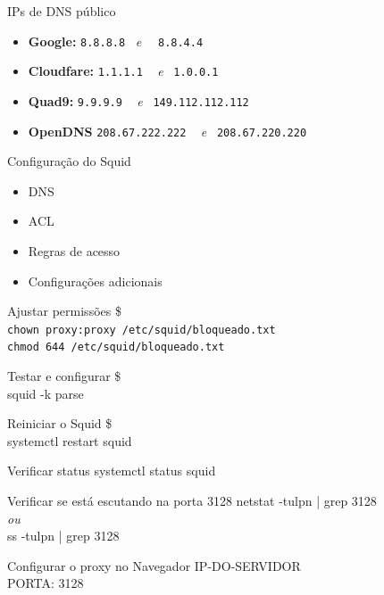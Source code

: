 \documentclass{if-beamer}
\begin{document}
 \begin{frame}{IPs de DNS público}
 	\begin{itemize}
 		\item \textbf{Google:} \texttt{8.8.8.8}~ \emph{e}~ ~\texttt{8.8.4.4}
 		\item \textbf{Cloudfare:} \texttt{1.1.1.1} ~ \emph{e}~ \texttt{1.0.0.1}
 		\item \textbf{Quad9:} \texttt{9.9.9.9} ~ \emph{e}~ \texttt{149.112.112.112}
 		\item \textbf{OpenDNS} \texttt{208.67.222.222} ~ \emph{e}~ \texttt{208.67.220.220}
 	\end{itemize}
 
 \end{frame}
 
 \begin{frame}[allowframebreaks]{Configuração do Squid}
 	\begin{itemize}
 		\item DNS
 		\item ACL
 		\item Regras de acesso
 		\item Configurações adicionais
 	\end{itemize} 
 
 	\framebreak
 	
 	\begin{exampleblock}{Ajustar permissões}
 	\large
 		\$ \\
 		\texttt{chown proxy:proxy /etc/squid/bloqueado.txt} \\
		\texttt{chmod 644 /etc/squid/bloqueado.txt}
	\end{exampleblock}
	
	\framebreak
	\begin{exampleblock}{Testar e configurar}
	\$ \\
		squid -k parse
	\end{exampleblock}
	\framebreak
	\begin{exampleblock}{Reiniciar o Squid}
		\centering
		\Large	
		\$ \\
			systemctl restart squid
	\end{exampleblock}
	
	\framebreak
	
	\begin{exampleblock}{Verificar status}
		\centering
			systemctl status squid
	\end{exampleblock}
	\begin{exampleblock}{Verificar se está escutando na porta 3128}
	\centering	
	netstat -tulpn | grep 3128
	\\ \emph{ou} \\
		ss -tulpn | grep 3128
	\end{exampleblock}
	
	\framebreak
	
	\begin{exampleblock}{Configurar o proxy no Navegador}
			\large
			\centering
				IP-DO-SERVIDOR \\
				PORTA: 3128
				
	\end{exampleblock}
 	\end{frame}
\end{document}
